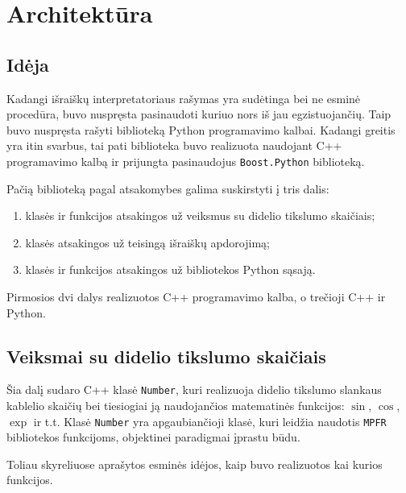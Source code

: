 \chapter{Architektūra}

\section{Idėja}

Kadangi išraiškų interpretatoriaus rašymas yra sudėtinga bei ne esminė
procedūra, buvo nuspręsta pasinaudoti kuriuo nors iš jau egzistuojančių.
Taip buvo nuspręsta rašyti biblioteką Python programavimo kalbai. Kadangi
greitis yra itin svarbus, tai pati biblioteka buvo realizuota naudojant
C++ programavimo kalbą ir prijungta pasinaudojus \verb|Boost.Python| 
\cite{boost_python} biblioteką.

Pačią biblioteką pagal atsakomybes galima suskirstyti į tris dalis:
\begin{enumerate}
  \item klasės ir funkcijos atsakingos už veiksmus su didelio tikslumo
    skaičiais;
  \item klasės atsakingos už teisingą išraiškų apdorojimą;
  \item klasės ir funkcijos atsakingos už bibliotekos Python sąsają.
\end{enumerate}
Pirmosios dvi dalys realizuotos C++ programavimo kalba, o trečioji
C++ ir Python.

\section{Veiksmai su didelio tikslumo skaičiais}

Šia dalį sudaro C++ klasė \verb|Number|, kuri realizuoja didelio tikslumo
slankaus kablelio skaičių bei tiesiogiai ją naudojančios matematinės
funkcijos: $\sin$, $\cos$, $\exp$ ir t.t. Klasė \verb|Number| yra 
apgaubiančioji klasė, kuri leidžia naudotis \verb|MPFR| \cite{mpfr} 
bibliotekos funkcijoms, objektinei paradigmai įprastu būdu.

Toliau skyreliuose aprašytos esminės idėjos, kaip buvo realizuotos kai
kurios funkcijos.



